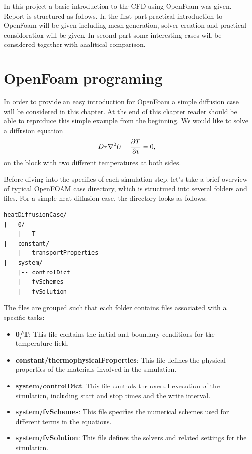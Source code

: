 \documentclass{article}
\begin{document}
In this project a basic introduction to the CFD using OpenFoam was given. Report is structured as follows. In the first part practical introduction to OpenFoam 
will be given including mesh generation, solver creation and practical considoration will be given. In second part some interesting cases will be considered together with analitical 
comparison.

\section{OpenFoam programing}
In order to provide an easy introduction for OpenFoam a simple diffusion case will be considered in this chapter.
At the end of this chapter reader should be able to reproduce this simple example from the beginning.
We would like to solve a diffusion equation
\begin{equation}
    D_T\laplacian{U} + \pdv{T}{t} = 0,
\end{equation} on the block with two different temperatures at both sides.

Before diving into the specifics of each simulation step, let's take a brief overview of typical OpenFOAM case directory,
which is structured into several folders and files. For a simple heat diffusion case, the directory looks as follows: 

 \begin{lstlisting}
heatDiffusionCase/
|-- 0/
    |-- T
|-- constant/
    |-- transportProperties
|-- system/
    |-- controlDict
    |-- fvSchemes
    |-- fvSolution
\end{lstlisting}

\noindent The files are grouped such that each folder contains files associated with a specific tasks:

\begin{itemize}
    \item \textbf{0/T}: This file contains the initial and boundary conditions for the temperature field.
    \item \textbf{constant/thermophysicalProperties}: This file defines the physical properties of the materials involved in the simulation.
    \item \textbf{system/controlDict}: This file controls the overall execution of the simulation, including start and stop times and the write interval.
    \item \textbf{system/fvSchemes}: This file specifies the numerical schemes used for different terms in the equations.
    \item \textbf{system/fvSolution}: This file defines the solvers and related settings for the simulation.
\end{itemize}
\end{document}
